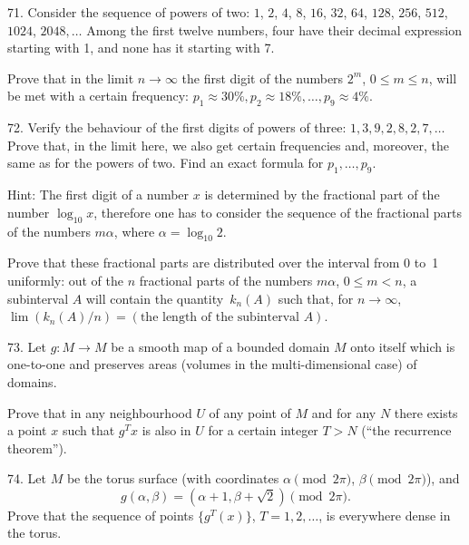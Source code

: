 \begin{problem}{71.}
Consider the sequence of powers of two: $1$, $2$, $4$, $8$, $16$, $32$, $64$,
$128$, $256$, $512$, $1024$, $2048, \dotsc$ Among the first twelve numbers, four have their decimal expression
starting with 1, and none has it starting with 7.

Prove that in the limit $n \to \infty$ the first digit of the numbers $2^m$,
$0\leqslant m \leqslant n$, will be met with a certain frequency:
$p_1 \approx 30\%, p_2 \approx 18\%, \dotsc, p_9 \approx 4\%$.
\end{problem}

\begin{problem}{72.}
Verify the behaviour of the first digits of powers of three: $1,
	3, 9, 2, 8, 2, 7, \dotsc$ Prove that, in the limit here, we also
get certain frequencies and, moreover, the same as for the powers of two.
Find an exact formula for $p_1, \dotsc, p_9$.

\begin{note}{Hint:}
	The first digit of a number $x$ is determined by the fractional part
	of the number $\log_{10} x$, therefore one has to consider the sequence of the fractional parts of
	the numbers $m \alpha$, where $\alpha=\log_{10} 2$.
\end{note}
Prove that these fractional parts are distributed over the interval from 0 to~1
uniformly: out of the $n$ fractional parts of the numbers $m \alpha$, $0 \leqslant m<n$,
a subinterval $A$ will contain the quantity~$k_n (A)$ such that, for $n \to \infty$,
$\lim (k_n (A)/n)=(\text{the length of the subinterval~$A$})$.
\end{problem}

\begin{problem}{73.}
Let $g\colon M \to M$ be a smooth map of a bounded domain $M$ onto itself which
is one-to-one and preserves areas (volumes in the multi-dimensional case) of domains.

Prove that in any neighbourhood $U$ of any point of $M$ and for any $N$ there exists a point $x$
such that $g^T x$ is also in $U$ for a certain integer $T>N$ (\enquote{the recurrence theorem}).
\end{problem}

\begin{problem}{74.}
Let $M$ be the torus surface (with coordinates $\alpha \pmod{2\pi}$, $\beta \pmod{2\pi}$),
and
\begin{equation*}
	g(\alpha, \beta)=(\alpha+1, \beta+ \sqrt{2}) \pmod{2\pi}.
\end{equation*}
Prove that the sequence of points
$\{g^T (x)\}$, $T=1, 2, \dotsc$, is everywhere dense in the torus.
\end{problem}

